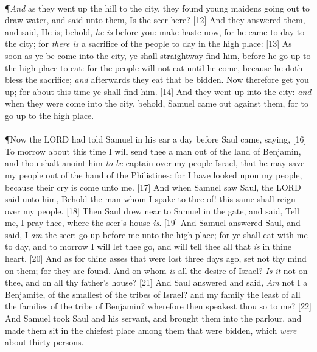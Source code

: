 \\
\P \textcolor[cmyk]{0.99998,1,0,0}{\emph{And} as they went up the hill to the city, they found young maidens going out to draw water, and said unto them, Is the seer here?}
[12] \textcolor[cmyk]{0.99998,1,0,0}{And they answered them, and said, He is; behold, \emph{he} \emph{is} before you: make haste now, for he came to day to the city; for \emph{there} \emph{is} a sacrifice of the people to day in the high place:}
[13] \textcolor[cmyk]{0.99998,1,0,0}{As soon as ye be come into the city, ye shall straightway find him, before he go up to the high place to eat: for the people will not eat until he come, because he doth bless the sacrifice; \emph{and} afterwards they eat that be bidden. Now therefore get you up; for about this time ye shall find him.}
[14] \textcolor[cmyk]{0.99998,1,0,0}{And they went up into the city: \emph{and} when they were come into the city, behold, Samuel came out against them, for to go up to the high place.}\\
\\
\P \textcolor[cmyk]{0.99998,1,0,0}{Now the LORD had told Samuel in his ear a day before Saul came, saying,}
[16] \textcolor[cmyk]{0.99998,1,0,0}{To morrow about this time I will send thee a man out of the land of Benjamin, and thou shalt anoint him \emph{to} \emph{be} captain over my people Israel, that he may save my people out of the hand of the Philistines: for I have looked upon my people, because their cry is come unto me.}
[17] \textcolor[cmyk]{0.99998,1,0,0}{And when Samuel saw Saul, the LORD said unto him, Behold the man whom I spake to thee of! this same shall reign over my people.}
[18] \textcolor[cmyk]{0.99998,1,0,0}{Then Saul drew near to Samuel in the gate, and said, Tell me, I pray thee, where the seer's house \emph{is}.}
[19] \textcolor[cmyk]{0.99998,1,0,0}{And Samuel answered Saul, and said, I \emph{am} the seer: go up before me unto the high place; for ye shall eat with me to day, and to morrow I will let thee go, and will tell thee all that \emph{is} in thine heart.}
[20] \textcolor[cmyk]{0.99998,1,0,0}{And as for thine asses that were lost three days ago, set not thy mind on them; for they are found. And on whom \emph{is} all the desire of Israel? \emph{Is} \emph{it} not on thee, and on all thy father's house?}
[21] \textcolor[cmyk]{0.99998,1,0,0}{And Saul answered and said, \emph{Am} not I a Benjamite, of the smallest of the tribes of Israel? and my family the least of all the families of the tribe of Benjamin? wherefore then speakest thou so to me?}
[22] \textcolor[cmyk]{0.99998,1,0,0}{And Samuel took Saul and his servant, and brought them into the parlour, and made them sit in the chiefest place among them that were bidden, which \emph{were} about thirty persons.}
